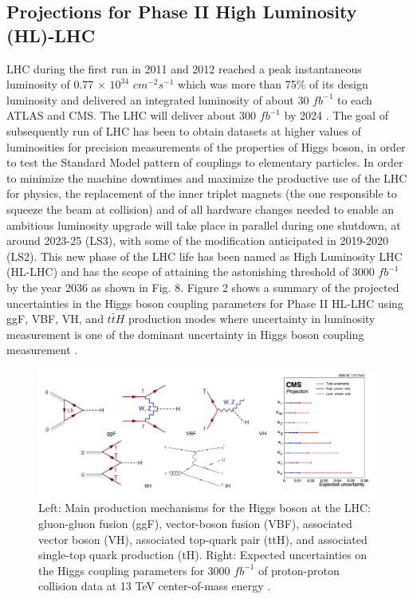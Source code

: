 \subsection{Projections for Phase II High Luminosity (HL)-LHC}
LHC during the first run in 2011 and 2012 reached a peak instantaneous luminosity of 0.77 $\times$ $10^{34}$ $cm^{-2}s^{-1}$ which was more than 75$\%$ of its design luminosity and delivered an integrated luminosity of about 30 $fb^{-1}$ to each ATLAS and CMS. The LHC will deliver about 300 $fb^{-1}$ by 2024 \cite{collaborations2019report}. The goal of subsequently run of LHC has been to obtain datasets at higher values of luminosities for precision measurements of the properties of Higgs boson, in order to test the Standard Model pattern of couplings to elementary particles. In order to minimize the machine downtimes and maximize the productive use of the LHC for physics, the replacement of the inner triplet magnets (the one responsible to squeeze the beam at collision) and  of  all  hardware  changes  needed  to  enable  an  ambitious  luminosity  upgrade  will  take  place in parallel during one shutdown, at around 2023-25 (LS3), with some of the modification anticipated in 2019-2020 (LS2). This new phase of the LHC life has been named as High Luminosity LHC (HL-LHC) and has the scope of attaining the astonishing threshold of 3000 $fb^{-1}$ by the year 2036 as shown in Fig. 8. Figure 2 shows a summary of the projected uncertainties in the Higgs boson coupling parameters for Phase II HL-LHC using ggF, VBF, VH, and ${t\bar{t}H}$ production modes where uncertainty in luminosity measurement is one of the dominant uncertainty in Higgs boson coupling measurement \cite{Tanabashi:2018oca}. \\





\begin{figure}[H]
  \centering
  \includegraphics[width=1 \columnwidth]{./hig_pro.png}
  \caption{\onehalfspacing Left: Main production mechanisms for the Higgs boson at the LHC: gluon-gluon fusion (ggF), vector-boson fusion (VBF), associated vector boson (VH), associated top-quark pair (ttH), and associated single-top quark production (tH). Right: Expected uncertainties on the Higgs coupling parameters for 3000 $fb^{-1}$ of proton-proton collision data at 13 TeV center-of-mass energy \cite{Tanabashi:2018oca}.}
  \label{fig:LHC}
\end{figure}
